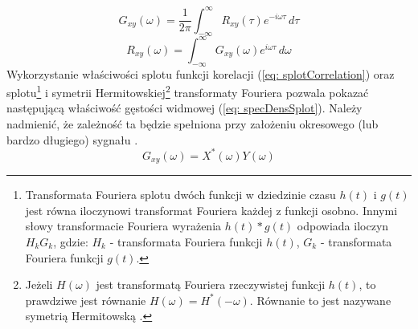 \begin{equation} \label{eq: crossspectralDensity}
	G_{xy}(\omega) = \frac{1}{2\pi}\int_{-\infty}^{\infty}R_{xy}(\tau)e^{-i\omega\tau}\,d\tau
\end{equation}
\begin{equation} \label{eq: crosscorrelationInversSpectralDensity}
	R_{xy}(\omega) = \int_{-\infty}^{\infty}G_{xy}(\omega)e^{i\omega\tau}\,d\omega
\end{equation}
Wykorzystanie właściwości splotu funkcji korelacji (\ref{eq: splotCorrelation}) oraz splotu\footnote{
	Transformata Fouriera splotu dwóch funkcji w dziedzinie czasu $h(t)$ i $g(t)$ jest równa iloczynowi transformat Fouriera każdej z funkcji osobno. Innymi słowy transformacie Fouriera wyrażenia $h(t)*g(t)$ odpowiada iloczyn $H_k G_k$, gdzie: $H_k$ - transformata Fouriera funkcji $h(t)$, $G_k$ - transformata Fouriera funkcji $g(t)$.}
 i symetrii Hermitowskiej\footnote{
 	Jeżeli $H(\omega)$ jest transformatą Fouriera rzeczywistej funkcji $h(t)$, to prawdziwe jest równanie $H(\omega)=H^*(-\omega)$. Równanie to jest nazywane symetrią Hermitowską \parencite{Boashash2015}.}
 transformaty Fouriera pozwala pokazać następującą właściwość gęstości widmowej (\ref{eq: specDensSplot}). Należy nadmienić, że zależność ta będzie spełniona przy założeniu okresowego (lub bardzo długiego) sygnału \parencite{Brincker2015}.
\begin{equation} \label{eq: specDensSplot}
	G_{xy}(\omega) = X^*(\omega)Y(\omega)
\end{equation}


